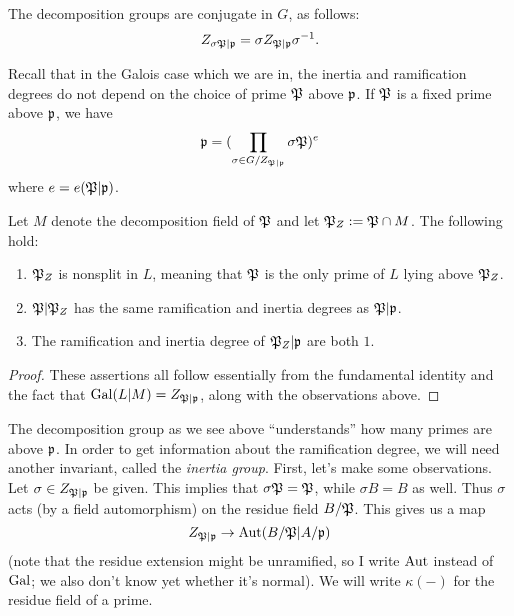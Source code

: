 The decomposition groups are conjugate in $G$, as follows:
\[ Z_{\sigma\mathfrak{P}|\mathfrak{p}} = \sigma Z_{\mathfrak{P}|\mathfrak{p}} \sigma^{-1}. \]

Recall that in the Galois case which we are in, the inertia and ramification degrees do not depend on the choice of prime $\mathfrak{P}$ above $\mathfrak{p}$.
If $\mathfrak{P}$ is a fixed prime above $\mathfrak{p}$, we have
\[ \mathfrak{p} = (\prod_{\sigma \in G/Z_{\mathfrak{P}|\mathfrak{p}}} \sigma\mathfrak{P})^{e} \]
where $e = e(\mathfrak{P}|\mathfrak{p})$.

\begin{proposition}
  Let $M$ denote the decomposition field of $\mathfrak{P}$ and let $\mathfrak{P}_{Z} := \mathfrak{P} \cap M$.
  The following hold:
  \begin{enumerate}
    \item $\mathfrak{P}_{Z}$ is nonsplit in $L$, meaning that $\mathfrak{P}$ is the only prime of $L$ lying above $\mathfrak{P}_{Z}$.
    \item $\mathfrak{P}|\mathfrak{P}_{Z}$ has the same ramification and inertia degrees as $\mathfrak{P}|\mathfrak{p}$.
    \item The ramification and inertia degree of $\mathfrak{P}_{Z}|\mathfrak{p}$ are both $1$.
  \end{enumerate}
\end{proposition}
\begin{proof}
  These assertions all follow essentially from the fundamental identity and the fact that $\operatorname{Gal}(L|M) = Z_{\mathfrak{P}|\mathfrak{p}}$, along with the observations above.
\end{proof}

The decomposition group as we see above ``understands'' how many primes are above $\mathfrak{p}$.
In order to get information about the ramification degree, we will need another invariant, called the \emph{inertia group}.
First, let's make some observations.
Let $\sigma \in Z_{\mathfrak{P}|\mathfrak{p}}$ be given.
This implies that $\sigma \mathfrak{P} = \mathfrak{P}$, while $\sigma B = B$ as well.
Thus $\sigma$ acts (by a field automorphism) on the residue field $B/\mathfrak{P}$.
This gives us a map
\[ Z_{\mathfrak{P}|\mathfrak{p}} \to \operatorname{Aut}(B/\mathfrak{P}|A/\mathfrak{p}) \]
(note that the residue extension might be unramified, so I write $\operatorname{Aut}$ instead of $\operatorname{Gal}$; we also don't know yet whether it's normal).
We will write $\kappa(-)$ for the residue field of a prime.

